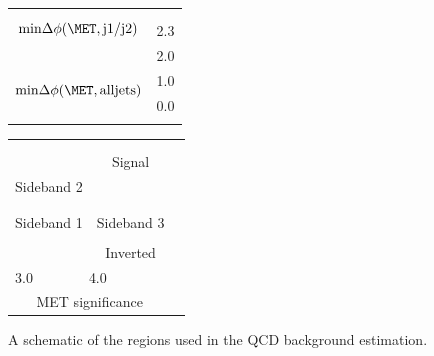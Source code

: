 \begin{figure}[h!]
\begin{center}
  \begin{tabular}{c r}
    &   \\
    \multirow{4}{*}{$\mathrm{min}\Delta\phi(\MET,\mathrm{j1/j2})$} & \\
    & \multirow{2}{*}{2.3} \\
    &  \\
    & \multirow{2}{*}{2.0}  \\
    & \\
    & \multirow{2}{*}{1.0}\\
    \multirow{2}{*}{$\mathrm{min}\Delta\phi(\MET,\mathrm{all jets})$} & \\
    & \multirow{2}{*}{0.0}\\
    & \\
    & \\
  \end{tabular}
  \begin{tabular}{c c c | c c c c}
\multicolumn{7}{|c}{}\\
\multicolumn{3}{|c|}{{\cellcolor{cyan}}} & \multicolumn{3}{|c}{\cellcolor{green}} & \\
\multicolumn{3}{|c|}{{\cellcolor{cyan}}} & \multicolumn{3}{|c}{\multirow{-2}{*}{\cellcolor{green}Signal}}  & \multirow{4}{*}{} \\
\cline{4-7}
\multicolumn{3}{|c|}{\multirow{-2}{*}{{\cellcolor{cyan}} Sideband 2}} & \multicolumn{3}{|c}{} & \\
\multicolumn{3}{|c|}{\multirow{-2}{*}{{\cellcolor{cyan}}}} & \multicolumn{3}{|c}{} & \\
\hline
\multicolumn{3}{|c|}{{\cellcolor{cyan}}} & \multicolumn{3}{|c}{\cellcolor{cyan}} & \\
\multicolumn{3}{|c|}{\multirow{-2}{*}{{\cellcolor{cyan}}Sideband 1}} & \multicolumn{3}{|c}{\multirow{-2}{*}{\cellcolor{cyan}Sideband 3}} & \\
\hline
\hline
\multicolumn{3}{|c|}{} & \multicolumn{3}{|c}{\cellcolor{orange}} & \\
\multicolumn{3}{|c|}{} & \multicolumn{3}{|c}{\multirow{-2}{*}{\cellcolor{orange}Inverted}} & \multirow{-2}{*}{} \\
\hline
\multicolumn{2}{l}{\hspace{-.4cm}3.0}  & \multicolumn{2}{c}{\hspace{.9cm}4.0} &  & \multicolumn{2}{c}{} \\
\multicolumn{6}{c}{MET significance} & \\
\end{tabular}
\end{center}
\caption{A schematic of the regions used in the \ac{QCD} background estimation.}
\label{fig:parkedqcdregions}
\end{figure}


